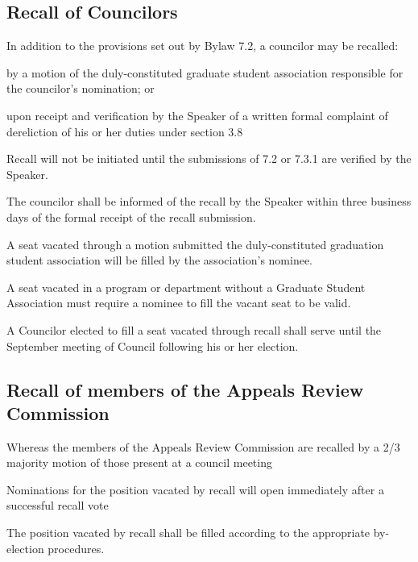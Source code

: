 \subsection {Recall of Councilors}
\begin{longenum}[ label*=\thesubsection.\arabic*., align=left]
	\item In addition to the provisions set out by Bylaw 7.2, a councilor may be recalled:
    \begin{longenum}[ label*=\arabic*., align=left]
		\item by a motion of the duly-constituted graduate student association responsible for the councilor's nomination; or
        \item upon receipt and verification by the Speaker of a written formal complaint of dereliction of his or her duties under section 3.8
	\end{longenum}
    \item Recall will not be initiated until the submissions of 7.2 or 7.3.1 are verified by the Speaker.
    \item The councilor shall be informed of the recall by the Speaker within three business days of the formal receipt of the recall submission.
    \item A seat vacated through a motion submitted the duly-constituted graduation student association will be filled by the association's nominee.
    \item A seat vacated in a program or department without a Graduate Student Association must require a nominee to fill the vacant seat to be valid. 
    \item A Councilor elected to fill a seat vacated through recall shall serve until the September meeting of Council following his or her election.
\end{longenum}

\subsection{Recall of members of the Appeals Review Commission}

\begin{longenum}[ label*=\thesubsection.\arabic*., align=left]
	\item Whereas the members of the Appeals Review Commission are recalled by a 2/3 majority motion of those present at a council meeting
    \item Nominations for the position vacated by recall will open immediately after a successful recall vote
    \item The position vacated by recall shall be filled according to the appropriate by-election procedures.
\end{longenum}

